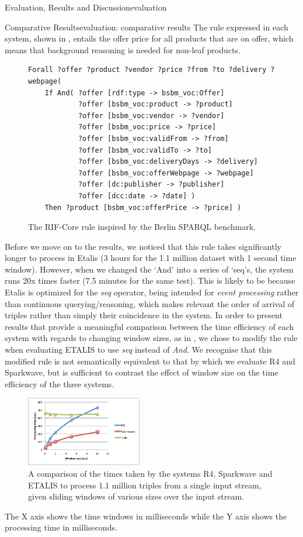 \begin{nestedsection}{Evaluation, Results and Discussion}{evaluation}
\begin{nestedsection}{Comparative Results}{evaluation: comparative results}
		The rule expressed in each system, shown in , entails the offer price for all products that are on offer, which means that background reasoning is needed for non-leaf products.
		\begin{figure}
			\centering
			\begin{verbatim}
Forall ?offer ?product ?vendor ?price ?from ?to ?delivery ?webpage(
    If And( ?offer [rdf:type -> bsbm_voc:Offer]
            ?offer [bsbm_voc:product -> ?product]
            ?offer [bsbm_voc:vendor -> ?vendor]
            ?offer [bsbm_voc:price -> ?price]
            ?offer [bsbm_voc:validFrom -> ?from]
            ?offer [bsbm_voc:validTo -> ?to]
            ?offer [bsbm_voc:deliveryDays -> ?delivery]
            ?offer [bsbm_voc:offerWebpage -> ?webpage]
            ?offer [dc:publisher -> ?publisher]
            ?offer [dcc:date -> ?date] )
    Then ?product [bsbm_voc:offerPrice -> ?price] )
			\end{verbatim}
			\caption{The RIF-Core rule inspired by the Berlin SPARQL benchmark.}
		\end{figure}
		Before we move on to the results, we noticed that this rule takes significantly longer to process in Etalis (3 hours for the 1.1 million dataset with 1 second time window).
		However, when we changed the `And' into a series of `seq's, the system runs 20x times faster (7.5 minutes for the same test).
		This is likely to be because Etalis is optimized for the \emph{seq} operator, being intended for \emph{event processing} rather than continuous querying/reasoning, which makes relevant the order of arrival of triples rather than simply their coincidence in the system.
		In order to present results that provide a meaningful comparison between the time efficiency of each system with regards to changing window sizes, as in , we chose to modify the rule when evaluating ETALIS to use \emph{seq} instead of \emph{And}.
		We recognise that this modified rule is not semantically equivalent to that by which we evaluate R4 and Sparkwave, but is sufficient to contrast the effect of window size on the time efficiency of the three systems.
		\begin{figure}
			\centering
			\includegraphics[width=0.45\textwidth]{all-systems-varying-windows}
			\caption{A comparison of the times taken by the systems R4, Sparkwave and ETALIS to process 1.1 million triples from a single input stream, given sliding windows of various sizes over the input stream.}
		\end{figure}
		The X axis shows the time windows in milliseconds while the Y axis shows the processing time in milliseconds.


\end{nestedsection}
\end{nestedsection}
